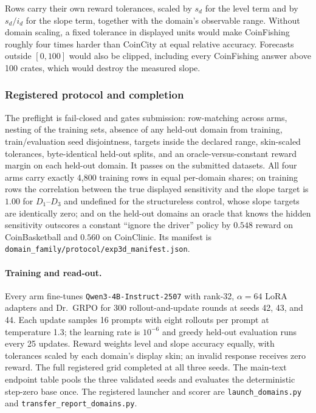 Rows carry their own reward tolerances, scaled by $s_d$ for the level term and by
$s_d/i_d$ for the slope term, together with the domain's observable range. Without
domain scaling, a fixed tolerance in displayed units would make CoinFishing
roughly four times harder than CoinCity at equal relative accuracy. Forecasts outside $[0,100]$
would also be clipped, including every CoinFishing answer above 100 crates, which
would destroy the measured slope.

\subsubsection{Registered protocol and completion}

The preflight is fail-closed and gates submission: row-matching across arms,
nesting of the training sets, absence of any held-out domain from training,
train/evaluation seed disjointness, targets inside the declared range, skin-scaled
tolerances, byte-identical held-out splits, and an oracle-versus-constant reward
margin on each held-out domain. It passes on the submitted datasets. All four arms
carry exactly 4{,}800 training rows in equal per-domain shares; on training rows
the correlation between the true displayed sensitivity and the slope target is
$1.00$ for $D_1$--$D_3$ and undefined for the structureless control, whose slope
targets are identically zero; and on the held-out domains an oracle that knows the
hidden sensitivity outscores a constant ``ignore the driver'' policy by $0.548$
reward on CoinBasketball and $0.560$ on CoinClinic. Its manifest is
\texttt{domain\_family/protocol/exp3d\_manifest.json}.

\paragraph{Training and read-out.}
Every arm fine-tunes \texttt{Qwen3-4B-Instruct-2507} with rank-32,
$\alpha{=}64$ LoRA adapters and Dr.~GRPO for 300 rollout-and-update rounds at seeds 42, 43, and 44.
Each update samples 16 prompts with eight rollouts per prompt at temperature 1.3;
the learning rate is $10^{-6}$ and greedy held-out evaluation runs every 25
updates. Reward weights level and slope accuracy equally, with tolerances scaled
by each domain's display skin; an invalid response receives zero reward. The
full registered grid completed at all three seeds. The main-text endpoint table
pools the three validated seeds and evaluates the deterministic step-zero base
once. The registered launcher and scorer are \texttt{launch\_domains.py} and
\texttt{transfer\_report\_domains.py}.

